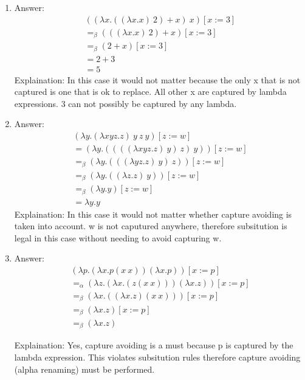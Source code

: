 \documentclass{article}
\begin{document}
\begin{enumerate}

	\item Answer: 
		\begin{align*}
			&((\lambda x.((\lambda x.x)\ 2) + x)\ x)[x := 3]&\\
			&=_{\beta}(((\lambda x.x)\ 2) + x)[x := 3]&\\
			&=_{\beta}(2 + x)[x := 3]&\\
			&= 2 + 3&\\
			&= 5&
		\end{align*}
		Explaination: In this case it would not matter because the only x that is
		not captured is one that is ok to replace. All other x are captured by
		lambda expressions. 3 can not possibly be captured by any lambda.

	\item Answer: 
		\begin{align*}
			&(\lambda y.(\lambda xyz.z)\ y\ z\ y)[z := w]&\\
			&=(\lambda y.((((\lambda xyz.z)\ y)\ z)\ y))[z := w]&\\
			&=_{\beta} (\lambda y.(((\lambda yz.z)\ y)\ z))[z := w]&\\
			&=_{\beta} (\lambda y.((\lambda z.z)\ y))[z := w]&\\
			&=_{\beta} (\lambda y.y)[z := w]&\\
			&= \lambda y.y&
		\end{align*}
		Explaination: In this case it would not matter whether capture avoiding is
		taken into account. w is not caputured anywhere, therefore subsitution is
		legal in this case without needing to avoid capturing w.

	\item Answer:
		\begin{align*}
			&(\lambda p.(\lambda x.p(x\ x)) (\lambda x.p))[x:=p]&\\
			&=_{\alpha} (\lambda z.(\lambda x.(z(x\ x))) (\lambda x.z))[x:=p]&\\
			&=_{\beta} (\lambda x.((\lambda x.z)(x\ x))) [x:=p]&\\
			&=_{\beta} (\lambda x.z) [x:=p]&\\
			&=_{\beta} (\lambda x.z)&
		\end{align*}

		Explaination: Yes, capture avoiding is a must because p is captured by the
		lambda expression. This violates subsitution rules therefore capture
		avoiding (alpha renaming) must be performed.
\end{enumerate}
\end{document}
